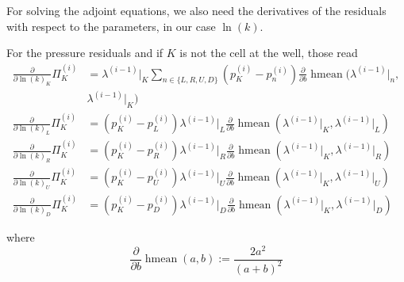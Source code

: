 \documentclass[conference]{IEEEtran}
\newcommand*{\pdiff}[2]{\ensuremath{\frac{\partial}{\partial{#2}}{#1}}}
\DeclareMathOperator*{\hmean}{hmean}
\begin{document}
For solving the adjoint equations, we also need the derivatives of the residuals with respect to the parameters, in our case $\ln(k).$

For the pressure residuals and if $K$ is not the cell at the well, those read\\
\begin{align}
\pdiff{\Pi_K^{(i)}}{\ln(k)_K} &= \lambda^{(i-1)}\lvert_K\sum_{n\in\{L, R, U, D\}} (p_K^{(i)} - p_n^{(i)})\pdiff{\hmean}{b}(\lambda^{(i-1)}\lvert_n,\\& \lambda^{(i-1)}\lvert_K)\nonumber\\
\pdiff{\Pi_K^{(i)}}{\ln(k)_L} &= (p_K^{(i)} - p_L^{(i)})\lambda^{(i-1)}\lvert_L \pdiff{\hmean}{b}(\lambda^{(i-1)}\lvert_K, \lambda^{(i-1)}\lvert_L) \\
\pdiff{\Pi_K^{(i)}}{\ln(k)_R} &= (p_K^{(i)} - p_R^{(i)})\lambda^{(i-1)}\lvert_R \pdiff{\hmean}{b}(\lambda^{(i-1)}\lvert_K, \lambda^{(i-1)}\lvert_R) \\
\pdiff{\Pi_K^{(i)}}{\ln(k)_U} &= (p_K^{(i)} - p_U^{(i)})\lambda^{(i-1)}\lvert_U \pdiff{\hmean}{b}(\lambda^{(i-1)}\lvert_K, \lambda^{(i-1)}\lvert_U) \\
\pdiff{\Pi_K^{(i)}}{\ln(k)_D} &= (p_K^{(i)} - p_D^{(i)})\lambda^{(i-1)}\lvert_D \pdiff{\hmean}{b}(\lambda^{(i-1)}\lvert_K, \lambda^{(i-1)}\lvert_D)
\end{align}

where 
\begin{equation}
\pdiff{\hmean}{b}(a, b) := \frac{2a^2}{(a+b)^2}
\end{equation}
%
%
\end{document}
